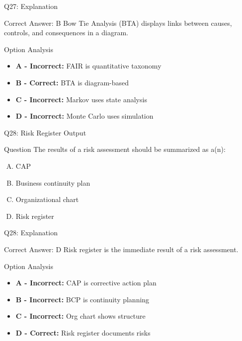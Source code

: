 \documentclass{beamer}
\begin{document}
	\begin{frame}{Q27: Explanation}
		\begin{block}{Correct Answer: B}
			Bow Tie Analysis (BTA) displays links between causes, controls, and consequences in a diagram.
		\end{block}
		\begin{block}{Option Analysis}
			\begin{itemize}
				\item \textbf{A - Incorrect:} FAIR is quantitative taxonomy
				\item \textbf{B - Correct:} BTA is diagram-based
				\item \textbf{C - Incorrect:} Markov uses state analysis
				\item \textbf{D - Incorrect:} Monte Carlo uses simulation
			\end{itemize}
		\end{block}
	\end{frame}
	
	\begin{frame}{Q28: Risk Register Output}
		\begin{block}{Question}
			The results of a risk assessment should be summarized as a(n):
		\end{block}
		\begin{enumerate}[(A)]
			\item CAP
			\item Business continuity plan
			\item Organizational chart
			\item Risk register
		\end{enumerate}
	\end{frame}
	
	\begin{frame}{Q28: Explanation}
		\begin{block}{Correct Answer: D}
			Risk register is the immediate result of a risk assessment.
		\end{block}
		\begin{block}{Option Analysis}
			\begin{itemize}
				\item \textbf{A - Incorrect:} CAP is corrective action plan
				\item \textbf{B - Incorrect:} BCP is continuity planning
				\item \textbf{C - Incorrect:} Org chart shows structure
				\item \textbf{D - Correct:} Risk register documents risks
			\end{itemize}
		\end{block}
	\end{frame}
	
\end{document}

